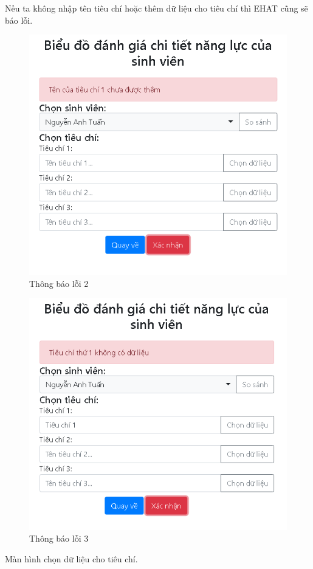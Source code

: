 Nếu ta không nhập tên tiêu chí hoặc thêm dữ liệu cho tiêu chí thì EHAT cũng sẽ báo lỗi.
\begin{center}
	\begin{figure}[htp]
		\begin{center}
			\includegraphics[width=0.6\linewidth]{img/19}
		\end{center}
		\caption{Thông báo lỗi 2}
		\label{refhinh51}
	\end{figure}
\end{center}

\begin{center}
	\begin{figure}[htp]
		\begin{center}
			\includegraphics[width=0.6\linewidth]{img/20}
		\end{center}
		\caption{Thông báo lỗi 3}
		\label{refhinh52}
	\end{figure}
\end{center}

\vskip 5cm
Màn hình chọn dữ liệu cho tiêu chí.

